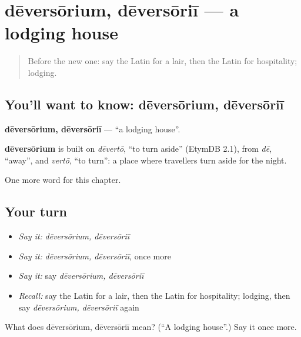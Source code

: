 \section[dēversōrium, dēversōriī]{dēversōrium, dēversōriī — a lodging house}

\label{lesson:LA-C227-deversorium}



\begin{quote}
Before the new one: say the Latin for a lair, then the Latin for hospitality; lodging.
\end{quote}

\subsection*{You'll want to know: dēversōrium, dēversōriī}
\textbf{dēversōrium, dēversōriī} — \textquotedblleft{}a lodging house\textquotedblright{}.

\begin{cousinweb}
\textbf{dēversōrium} is built on \emph{dēvertō}, \textquotedblleft{}to turn aside\textquotedblright{} (EtymDB 2.1), from \emph{dē}, \textquotedblleft{}away\textquotedblright{}, and \emph{vertō}, \textquotedblleft{}to turn\textquotedblright{}: a place where travellers turn aside for the night.
\end{cousinweb}

\begin{grammarlens}[title={What you've built}]
One more word for this chapter.
\end{grammarlens}

\subsection*{Your turn}
\begin{itemize}
\raggedright
  \item \emph{Say it:} \emph{dēversōrium, dēversōriī}
  \item \emph{Say it:} \emph{dēversōrium, dēversōriī}, once more
  \item \emph{Say it:} say \emph{dēversōrium, dēversōriī}
  \item \emph{Recall:} say the Latin for a lair, then the Latin for hospitality; lodging, then say \emph{dēversōrium, dēversōriī} again
\end{itemize}

\begin{tcolorbox}[breakable,colback=teal!4,colframe=teal!35!black,title={Before you move on}]
What does dēversōrium, dēversōriī mean? (\textquotedblleft{}A lodging house\textquotedblright{}.) Say it once more.
\end{tcolorbox}
